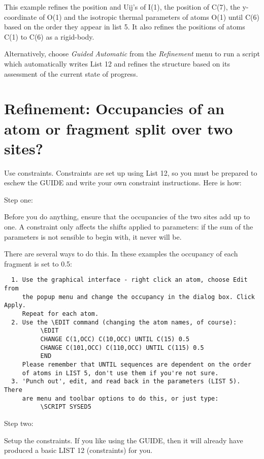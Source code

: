 \documentclass[10pt,a4paper]{report}
\begin{document}
This example refines the position and Uij's of I(1), the position
of C(7), the y-coordinate of O(1) and the isotropic thermal
parameters of atoms O(1) until C(6) based on the order they appear
in list 5. It also refines the positions of atoms C(1) to C(6) as a rigid-body.



Alternatively, choose \emph{Guided} \emph{Automatic} from the
\emph{Refinement} menu to run a script which automatically writes List
12 and refines the structure based on its assessment of the
current state of progress.

\section{Refinement: Occupancies of an atom or fragment split over two sites?}


Use constraints. Constraints are set up using List 12, so you must be
prepared to eschew the GUIDE and write your own constraint instructions. Here is how:





Step one:


Before you do anything, ensure that the occupancies of the two sites add up to one.
A constraint only affects the shifts applied to parameters: if the sum of the 
parameters is not sensible to begin with, it never will be.


There are several ways to do this. In these examples the occupancy of each
fragment is set to 0.5:
\small\begin{verbatim}
  1. Use the graphical interface - right click an atom, choose Edit from
     the popup menu and change the occupancy in the dialog box. Click Apply.
     Repeat for each atom. 
  2. Use the \EDIT command (changing the atom names, of course):
          \EDIT
          CHANGE C(1,OCC) C(10,OCC) UNTIL C(15) 0.5
          CHANGE C(101,OCC) C(110,OCC) UNTIL C(115) 0.5
          END
     Please remember that UNTIL sequences are dependent on the order
     of atoms in LIST 5, don't use them if you're not sure.
  3. 'Punch out', edit, and read back in the parameters (LIST 5). There
     are menu and toolbar options to do this, or just type:
          \SCRIPT SYSED5
\end{verbatim}\normalsize




Step two:


Setup the constraints. If you like using the GUIDE, then it will already
have produced a basic LIST 12 (constraints) for you.
\end{document}
